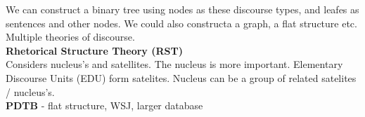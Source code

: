 \documentclass[]{article}
\begin{document}
	We can construct a binary tree using nodes as these discourse types, and leafes as sentences and other nodes. We could also constructa a graph, a flat structure etc. Multiple theories of discourse. \\
	
	\textbf{Rhetorical Structure Theory (RST)} \\
	Considers nucleus's and satellites. The nucleus is more important.
	Elementary Discourse Units (EDU) form satelites. Nucleus can be a group of related satelites / nucleus's. \\ 
	
	\textbf{PDTB} - flat structure, WSJ, larger database

	
	
	\clearpage
	
	
	
\end{document}
